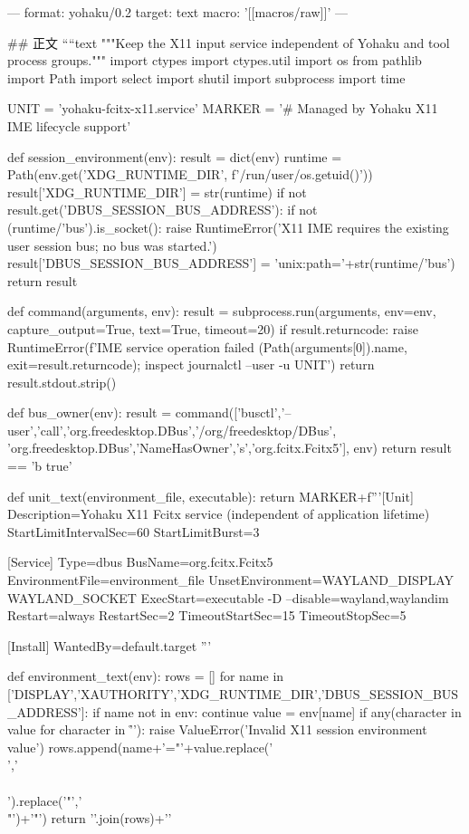 ---
format: yohaku/0.2
target: text
macro: '[[macros/raw]]'
---

## 正文
````text
"""Keep the X11 input service independent of Yohaku and tool process groups."""
import ctypes
import ctypes.util
import os
from pathlib import Path
import select
import shutil
import subprocess
import time

UNIT = 'yohaku-fcitx-x11.service'
MARKER = '# Managed by Yohaku X11 IME lifecycle support\n'


def session_environment(env):
    result = dict(env)
    runtime = Path(env.get('XDG_RUNTIME_DIR', f'/run/user/{os.getuid()}'))
    result['XDG_RUNTIME_DIR'] = str(runtime)
    if not result.get('DBUS_SESSION_BUS_ADDRESS'):
        if not (runtime/'bus').is_socket():
            raise RuntimeError('X11 IME requires the existing user session bus; no bus was started.')
        result['DBUS_SESSION_BUS_ADDRESS'] = 'unix:path='+str(runtime/'bus')
    return result


def command(arguments, env):
    result = subprocess.run(arguments, env=env, capture_output=True, text=True, timeout=20)
    if result.returncode:
        raise RuntimeError(f'IME service operation failed ({Path(arguments[0]).name}, exit={result.returncode}); inspect journalctl --user -u {UNIT}')
    return result.stdout.strip()


def bus_owner(env):
    result = command(['busctl','--user','call','org.freedesktop.DBus','/org/freedesktop/DBus',
                      'org.freedesktop.DBus','NameHasOwner','s','org.fcitx.Fcitx5'], env)
    return result == 'b true'


def unit_text(environment_file, executable):
    return MARKER+f'''[Unit]
Description=Yohaku X11 Fcitx service (independent of application lifetime)
StartLimitIntervalSec=60
StartLimitBurst=3

[Service]
Type=dbus
BusName=org.fcitx.Fcitx5
EnvironmentFile={environment_file}
UnsetEnvironment=WAYLAND_DISPLAY WAYLAND_SOCKET
ExecStart={executable} -D --disable=wayland,waylandim
Restart=always
RestartSec=2
TimeoutStartSec=15
TimeoutStopSec=5

[Install]
WantedBy=default.target
'''


def environment_text(env):
    rows = []
    for name in ['DISPLAY','XAUTHORITY','XDG_RUNTIME_DIR','DBUS_SESSION_BUS_ADDRESS']:
        if name not in env:
            continue
        value = env[name]
        if any(character in value for character in '\r\n\0'):
            raise ValueError('Invalid X11 session environment value')
        rows.append(name+'="'+value.replace('\\','\\\\').replace('"','\\"')+'"')
    return '\n'.join(rows)+'\n'


